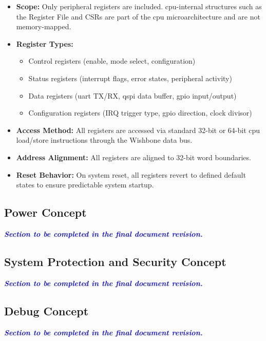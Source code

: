 \begin{itemize}
    \item \textbf{Scope:}  
          Only peripheral registers are included.  
          \gls{cpu}-internal structures such as the Register File and CSRs are part of the \gls{cpu} microarchitecture 
          and are not memory-mapped.

    \item \textbf{Register Types:}
        \begin{itemize}
            \item Control registers (enable, mode select, configuration)
            \item Status registers (interrupt flags, error states, peripheral activity)
            \item Data registers (\gls{uart} TX/RX, \gls{qspi} data buffer, \gls{gpio} input/output)
            \item Configuration registers (\gls{IRQ} trigger type, \gls{gpio} direction, clock divisor)
        \end{itemize}

    \item \textbf{Access Method:}  
          All registers are accessed via standard 32-bit or 64-bit \gls{cpu} load/store instructions through the 
          Wishbone data bus.

    \item \textbf{Address Alignment:}  
          All registers are aligned to 32-bit word boundaries.

    \item \textbf{Reset Behavior:}  
          On system reset, all registers revert to defined default states to ensure predictable system startup.

\end{itemize}


\subsection{Power Concept}

\textcolor{blue}{\textbf{\textit{Section to be completed in the final document revision.}}}

\subsection{System Protection and Security Concept}

\textcolor{blue}{\textbf{\textit{Section to be completed in the final document revision.}}}

\subsection{Debug Concept}

\textcolor{blue}{\textbf{\textit{Section to be completed in the final document revision.}}}


